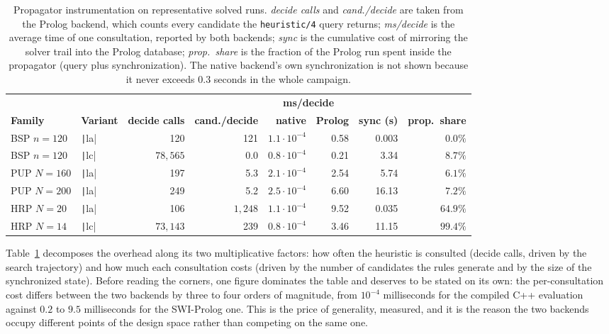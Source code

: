 \begin{table}[H]
\centering
\footnotesize
\begin{tabular}{llrrrrrr}
\toprule
 & & & & \multicolumn{2}{c}{\textbf{ms/decide}} & & \\
\cmidrule(lr){5-6}
\textbf{Family} & \textbf{Variant} & \textbf{decide calls} & \textbf{cand./decide} & \textbf{native} & \textbf{Prolog} & \textbf{sync (s)} & \textbf{prop.\ share}\\
\midrule
BSP $n{=}120$ & \texttt|la| & 120 & 121 & $1.1\!\cdot\!10^{-4}$ & 0.58 & 0.003 & $0.0\%$\\
BSP $n{=}120$ & \texttt|lc| & $78{,}565$ & 0.0 & $0.8\!\cdot\!10^{-4}$ & 0.21 & 3.34 & $8.7\%$\\
PUP $N{=}160$ & \texttt|la| & 197 & 5.3 & $2.1\!\cdot\!10^{-4}$ & 2.54 & 5.74 & $6.1\%$\\
PUP $N{=}200$ & \texttt|la| & 249 & 5.2 & $2.5\!\cdot\!10^{-4}$ & 6.60 & 16.13 & $7.2\%$\\
HRP $N{=}20$  & \texttt|la| & 106 & $1{,}248$ & $1.1\!\cdot\!10^{-4}$ & 9.52 & 0.035 & $64.9\%$\\
HRP $N{=}14$  & \texttt|lc| & $73{,}143$ & 239 & $0.8\!\cdot\!10^{-4}$ & 3.46 & 11.15 & $99.4\%$\\
\bottomrule
\end{tabular}
\caption{Propagator instrumentation on representative solved runs. \emph{decide calls} and \emph{cand./decide} are taken from the Prolog backend, which counts every candidate the \texttt{heuristic/4} query returns; \emph{ms/decide} is the average time of one consultation, reported by both backends; \emph{sync} is the cumulative cost of mirroring the solver trail into the Prolog database; \emph{prop.\ share} is the fraction of the Prolog run spent inside the propagator (query plus synchronization). The native backend's own synchronization is not shown because it never exceeds $0.3$ seconds in the whole campaign.}
\label{tab:per-decision}
\end{table}

Table~\ref{tab:per-decision} decomposes the overhead along its two multiplicative factors: how often the heuristic is consulted (decide calls, driven by the search trajectory) and how much each consultation costs (driven by the number of candidates the rules generate and by the size of the synchronized state). Before reading the corners, one figure dominates the table and deserves to be stated on its own: the per-consultation cost differs between the two backends by three to four orders of magnitude, from $10^{-4}$ milliseconds for the compiled C++ evaluation against $0.2$ to $9.5$ milliseconds for the SWI-Prolog one. This is the price of generality, measured, and it is the reason the two backends occupy different points of the design space rather than competing on the same one.

